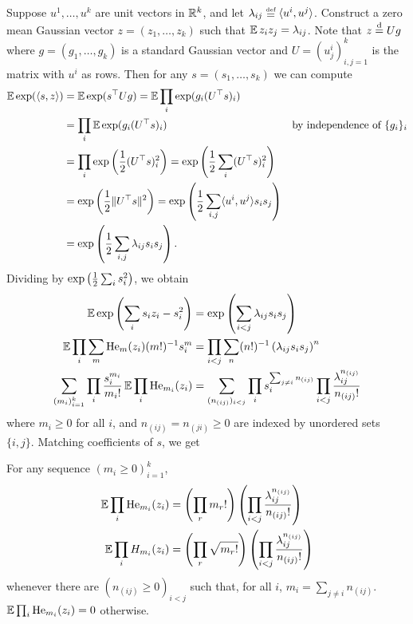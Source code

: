 \documentclass[main.tex]{subfiles}
\begin{document}
Suppose $u^1, \ldots, u^k$ are unit vectors in $\mathbb{R}^k$, and let $\lambda_{ij} \defeq \la u^i, u^j\ra$.
Construct a zero mean Gaussian vector $z = (z_1, \ldots, z_k)$ such that $\operatorname*{\mathbb{E}} z_i z_j = \lambda_{ij}$.
Note that $z \overset{\mathrm{d}}{=} U g$ where $g = (g_1, \ldots, g_k)$ is a standard Gaussian vector and $U = (u^i_j)_{i,j=1}^k$ is the matrix with $u^i$ as rows.
Then for any $s = (s_1, \ldots, s_k)$ we can compute
\begin{align*}
    \EV \exp(\la s, z \ra)
        &=
            \EV \exp(s^\trsp U g)
        = 
            \EV \prod_i \exp(g_i (U^\trsp s)_i)
            \\
        &=
            \prod_i \EV \exp(g_i (U^\trsp s)_i)
        &
            \pushright{\text{by independence of $\{g_i\}_i$}}
            \\
        &=
            \prod_i \exp\left(\f 1 2 (U^\trsp s)_i^2\right)
        =
            \exp\left(\f 1 2 \sum_i (U^\trsp s)_i^2\right)
            \\
        &=
            \exp\left(\f 1 2 \|U^\trsp s\|^2\right)
        =
            \exp \lp \f 1 2 \sum_{i,j} \la u^i, u^j \ra s_i s_j \rp
            \\
        &=
            \exp \lp \f 1 2 \sum_{i,j} \lambda_{ij} s_i s_j \rp
            .
\end{align*}
Dividing by $\exp\left( \frac{1}{2} \sum_i s_i^2 \right)$, we obtain
\begin{align*}
    \operatorname*{\mathbb{E}} \exp\left(\sum_i s_i z_i - s_i^2\right)
        &=
            \exp \left( \sum_{i< j} \lambda_{ij} s_i s_j \right)
            \\
    \operatorname*{\mathbb{E}} \prod_i \sum_m \mathrm{He}_m(z_i) (m!)^{-1} s_i^m
        &=
            \prod_{i< j} \sum_n (n!)^{-1}\left( \lambda_{ij} s_i s_j\right)^n
            \\
    \sum_{(m_i)_{i=1}^k}
        \prod_i \frac{s_i^{m_i}}{m_i!} \operatorname*{\mathbb{E}} \prod_i \mathrm{He}_{m_i}(z_i)
        &=
            \sum_{(n_{(ij)})_{i<j}}
                \prod_i s_i^{\sum_{j \ne i} n_{(ij)}}
                \prod_{i<j} \frac{\lambda_{ij}^{n_{(ij)}}}{n_{(ij)}!}
\end{align*}
where $m_i \ge 0$ for all $i$, and $n_{(ij)} = n_{(ji)} \ge 0$ are indexed by unordered sets $\{i,j\}$.
Matching coefficients of $s$, we get
\begin{thm}
For any sequence $(m_i \ge 0)_{i=1}^k$,
\begin{align*}
    \operatorname*{\mathbb{E}} \prod_i \mathrm{He}_{m_i}(z_i)
        &=
            \left( \prod_r m_r! \right) 
            \left( \prod_{i<j} \frac{\lambda_{ij}^{n_{(ij)}}}{n_{(ij)}!}
                \right)
            \\
    \operatorname*{\mathbb{E}} \prod_i H_{m_i}(z_i)
        &=
            \left( \prod_r \sqrt{m_r!} \right) 
            \left( \prod_{i<j} \frac{\lambda_{ij}^{n_{(ij)}}}{n_{(ij)}!}
                \right)
\end{align*}
whenever there are $(n_{(ij)} \ge 0)_{i<j}$ such that, for all $i$, $m_i = \sum_{j\ne i} n_{(ij)}$.
$\operatorname*{\mathbb{E}} \prod_i \mathrm{He}_{m_i}(z_i) = 0$ otherwise.
\end{thm}
\end{document}
